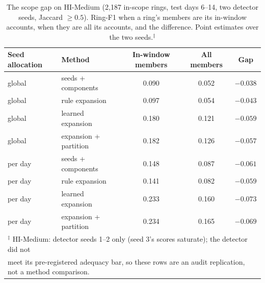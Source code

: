 \begin{table}[t]
\centering
\caption{The scope gap on HI-Medium (2{,}187 in-scope rings, test days 6--14, two detector
seeds, Jaccard $\ge 0.5$). Ring-F1 when a ring's members are its in-window accounts, when they
are all its accounts, and the difference. Point estimates over the two seeds.$^{\ddagger}$}
\label{tab:hm-audit}
\small
\begin{tabular}{llccc}
\toprule
Seed allocation & Method & In-window members & All members & Gap \\
\midrule
global  & seeds + components       & 0.090 & 0.052 & $-0.038$ \\ %
global  & rule expansion           & 0.097 & 0.054 & $-0.043$ \\ %
global  & learned expansion        & 0.180 & 0.121 & $-0.059$ \\ %
global  & expansion + partition    & 0.182 & 0.126 & $-0.057$ \\ %
\midrule
per day & seeds + components       & 0.148 & 0.087 & $-0.061$ \\ %
per day & rule expansion           & 0.141 & 0.082 & $-0.059$ \\ %
per day & learned expansion        & 0.233 & 0.160 & $-0.073$ \\ %
per day & expansion + partition    & 0.234 & 0.165 & $-0.069$ \\ %
\bottomrule
\multicolumn{5}{l}{\footnotesize $^{\ddagger}$ HI-Medium: detector seeds 1--2 only (seed 3's scores saturate); the detector did not}\\
\multicolumn{5}{l}{\footnotesize meet its pre-registered adequacy bar, so these rows are an audit replication, not a method comparison.}\\
\end{tabular}
\end{table}
